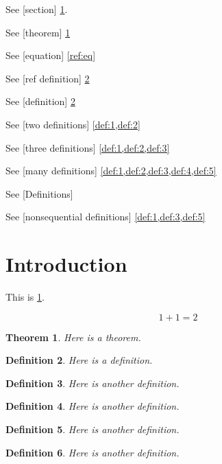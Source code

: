 \documentclass{amsart}
\newtheorem{theorem}{Theorem}
\newtheorem{definition}[theorem]{Definition}
\begin{document}
See [section] \cref{sec:intro}.

See [theorem] \cref{thm:1}

See [equation] \cref{ref:eq}

See [ref definition] \ref{def:1}

See [definition] \cref{def:1}

See [two definitions] \cref{def:1,def:2}

See [three definitions] \cref{def:1,def:2,def:3}

See [many definitions] \cref{def:1,def:2,def:3,def:4,def:5}

See [Definitions] 

See [nonsequential definitions] \cref{def:1,def:3,def:5}

\section{Introduction}
\label{sec:intro}

This is \cref{sec:intro}.

\begin{equation}
\label{ref:eq}
1 + 1 = 2
\end{equation}

\begin{theorem}\label{thm:1}
Here is a theorem.
\end{theorem}

\begin{definition}
\label{def:1}
Here is a definition.
\end{definition}

\begin{definition}
\label{def:2}
Here is another definition.
\end{definition}

\begin{definition}
\label{def:3}
Here is another definition.
\end{definition}

\begin{definition}
\label{def:4}
Here is another definition.
\end{definition}

\begin{definition}
\label{def:5}
Here is another definition.
\end{definition}
\end{document}
